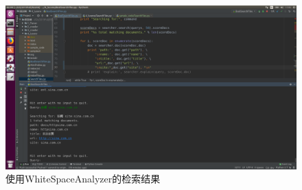 \documentclass{article}
\begin{document}
\begin{figure}[htbp]
\centering
\includegraphics[width=14.5cm]{img/sitesearch.png}
\caption{使用WhiteSpaceAnalyzer的检索结果}
\label{fig:sitetest2}
\end{figure}
\end{document}
